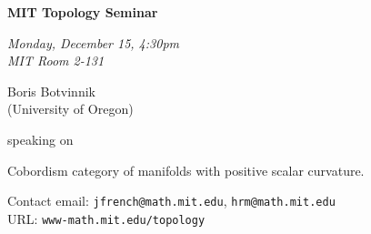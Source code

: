 \documentclass{slides}
\begin{document}
\begin{center}

{\fontsize {54pt}{40pt}\selectfont

\textrm{
{\textbf{MIT Topology Seminar}}}
}
\medskip


{\large\textrm{\emph{Monday, December 15, 4:30pm\\MIT Room 2-131}}}



\bigskip

\textrm{{\LARGE Boris Botvinnik  \\[.5cm](University of Oregon)}}

\bigskip\bigskip\bigskip
\textrm{speaking on}
\bigskip\bigskip\bigskip

\textrm{\LARGE Cobordism category of manifolds with positive scalar curvature. }\\

\end{center}

\vspace{1cm}

{\small
\textrm{Contact email: } \texttt{jfrench@math.mit.edu}, \texttt{hrm@math.mit.edu}\\
\textrm{URL: } \texttt{www-math.mit.edu/topology}
}
\end{document}
